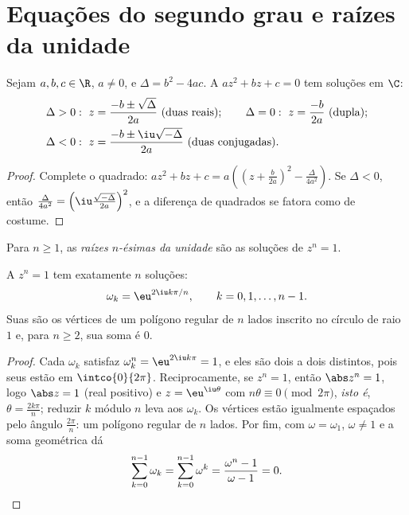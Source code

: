\section{Equações do segundo grau e raízes da unidade}

\begin{theorem}\label{thm:g12:complex:quadratic}
Sejam $a, b, c \in \R$, $a \neq 0$, e $\Delta = b^2 - 4ac$. A 
$az^2 + bz + c = 0$ tem soluções em $\C$:
\[
\begin{aligned}
&\Delta > 0:\ z = \frac{-b \pm \sqrt{\Delta}}{2a} \ (\text{duas reais}); \qquad
\Delta = 0:\ z = \frac{-b}{2a} \ (\text{dupla}); \\
&\Delta < 0:\ z = \frac{-b \pm \iu\sqrt{-\Delta}}{2a} \ (\text{duas conjugadas}).
\end{aligned}
\]
\end{theorem}

\begin{proof}
Complete o quadrado:
$az^2 + bz + c = a\left(\left(z + \frac{b}{2a}\right)^2 -
\frac{\Delta}{4a^2}\right)$. Se $\Delta < 0$, então
$\frac{\Delta}{4a^2} = \left(\iu\frac{\sqrt{-\Delta}}{2a}\right)^2$, e a
diferença de quadrados se fatora como de costume.
\end{proof}

\begin{definition}\label{def:g12:complex:rootsofunity}
Para $n \geq 1$, as \emph{raízes $n$-ésimas da unidade} são as soluções de $z^n = 1$.
\end{definition}

\begin{theorem}\label{thm:g12:complex:rootsofunity}
A  $z^n = 1$ tem exatamente $n$ soluções:
\[
\omega_k = \eu^{2\iu k\pi/n}, \qquad k = 0, 1, \dots, n-1 .
\]
Suas  são os vértices de um polígono regular de $n$ lados inscrito
no círculo de raio $1$ e, para $n \geq 2$, sua soma é $0$.
\end{theorem}

\begin{proof}
Cada $\omega_k$ satisfaz $\omega_k^n = \eu^{2\iu k\pi} = 1$, e eles são
dois a dois distintos, pois seus  estão em $\intco{0}{2\pi}$.
Reciprocamente, se $z^n = 1$, então $\abs z^n = 1$, logo $\abs z = 1$
(real positivo) e $z = \eu^{\iu\theta}$ com
$n\theta \equiv 0 \pmod{2\pi}$, \emph{isto é},
$\theta = \frac{2k\pi}{n}$; reduzir $k$ módulo $n$ leva aos $\omega_k$. Os
vértices estão igualmente espaçados pelo ângulo $\frac{2\pi}{n}$: um
polígono regular de $n$ lados. Por fim, com $\omega = \omega_1$,
$\omega \neq 1$ e a soma geométrica dá
\[
\sum_{k=0}^{n-1}\omega_k = \sum_{k=0}^{n-1}\omega^k
= \frac{\omega^n - 1}{\omega - 1} = 0 . \qedhere
\]
\end{proof}

